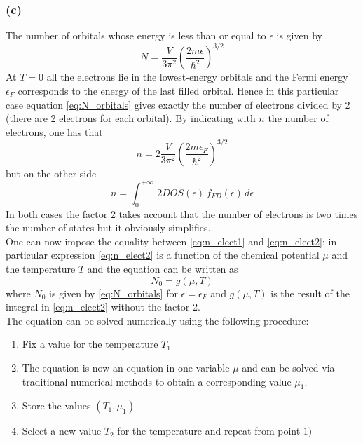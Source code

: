 \documentclass{article}
\begin{document}
\subsubsection*{(c)}
The number of orbitals whose energy is less than or equal to $\epsilon$ is given by 
\begin{equation}
    N = \frac{V}{3\pi^2} \left(\frac{2m\epsilon}{\hbar^2}\right)^{3/2}
    \label{eq:N_orbitals}
\end{equation}
At $T=0$ all the electrons lie in the lowest-energy orbitals and the Fermi energy $\epsilon_F$
corresponds to the energy of the last filled orbital. Hence in this particular case equation \ref{eq:N_orbitals}
gives exactly the number of electrons divided by 2 (there are 2 electrons for each orbital). By indicating with $n$ the number of electrons,
one has that 
\begin{equation}
    n = 2\frac{V}{3\pi^2} \left(\frac{2m\epsilon_F}{\hbar^2}\right)^{3/2}
    \label{eq:n_elect1}
\end{equation}
but on the other side
\begin{equation}
    n = \int_0^{+\infty} \, 2DOS(\epsilon) \, f_{FD}(\epsilon) \, d\epsilon
    \label{eq:n_elect2}
\end{equation}
In both cases the factor 2 takes account that the number of electrons is two times the number of states but it obviously simplifies. \\
One can now impose the equality between \ref{eq:n_elect1} and \ref{eq:n_elect2}: in particular expression \ref{eq:n_elect2} is a function of the chemical potential $\mu$ and the temperature $T$ and 
the equation can be written as 
\begin{equation*}
    N_0 = g(\mu, T)
\end{equation*}
where $N_0$ is given by \ref{eq:N_orbitals} for $\epsilon=\epsilon_F$ and $g(\mu, T)$ is the result of the integral in \ref{eq:n_elect2} without the factor 2. \\
The equation can be solved numerically using the following procedure:
\begin{enumerate}
    \item Fix a value for the temperature $T_1$
    \item The equation is now an equation in one variable $\mu$ and can be solved via traditional numerical methods to obtain a corresponding value $\mu_1$.
    \item Store the values $(T_1, \mu_1)$
    \item Select a new value $T_2$ for the temperature and repeat from point $1)$
\end{enumerate}
\end{document}
